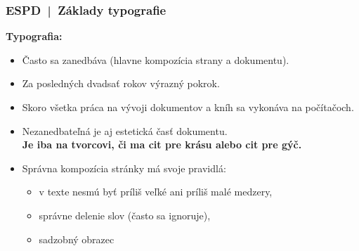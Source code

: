 \documentclass[compress,aspectratio=32]{beamer}
\def\Bmodra{\color{blue!90!black}}
\newcommand\fsectionN[1][|]{\bf{\Large\bf\color{white!80!blue}\sectionN\ #1\ }\color{white!90!black}\large\bf}
\begin{document}
\def\sectionN{ESPD}
\begin{frame}[t]
\frametitle{\fsectionN Základy typografie}

{\bf\Bmodra Typografia:}

\begin{itemize}
\item Často sa zanedbáva (hlavne kompozícia strany a dokumentu).
                                                 
\item Za posledných dvadsať rokov výrazný pokrok. 
      
\item Skoro všetka práca na vývoji dokumentov a kníh sa vykonáva na počítačoch.
      
\end{itemize}
\pause

\medskip


\begin{itemize}
\item Nezanedbateľná je aj estetická časť dokumentu.\\
      {\bf Je iba na tvorcovi, či ma cit pre krásu alebo cit pre gýč.}
      
\item Správna kompozícia stránky má svoje pravidlá:
      
  \begin{itemize}
  \item v texte nesmú byť príliš veľké ani príliš malé medzery,
      
  \item správne delenie slov (často sa ignoruje),

  \item sadzobný obrazec 


  \end{itemize}

\end{itemize}
 


\end{frame}

%
\end{document}
